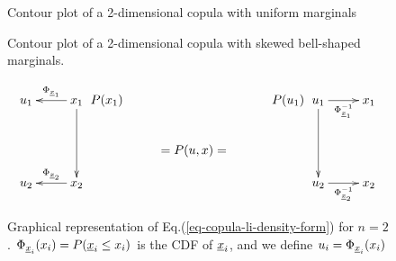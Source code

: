 \begin{figure}[!h]
\begin{floatrow}
 {\caption{Contour plot of a 2-dimensional copula
 with uniform marginals}
 \label{fig-copula1}}
 {\caption{Contour plot of a 2-dimensional copula
 with skewed bell-shaped marginals.}
 \label{fig-copula2}}
\end{floatrow}
\end{figure}





\begin{figure}[h!]
$$
\xymatrix{
u_1
&x_1\ar[l]_{\Phi_{\rvx_1}}\ar[dd]
\\
\\
u_2
&x_2\ar[l]_{\Phi_{\rvx_2}}
}
\xymatrix{P(x_1)
\\
&=P(u, x)=&}
\xymatrix{P(u_1)
\\}
\xymatrix{
u_1\ar[dd]\ar[r]_{\Phi_{\rvx_1}^{-1}}
&x_1
\\
\\
u_2\ar[r]_{\Phi_{\rvx_2}^{-1}}
&x_2
}
$$
\caption{Graphical representation
of Eq.(\ref{eq-copula-li-density-form}) for $n=2$.
$\Phi_{
{\underline{x}}_i}(x_i) = P({\underline{x}}_i\leq x_i)$
is the CDF of ${\underline{x}}_i$,
and we define
$u_i = \Phi_{{\underline{x}}_i}(x_i)$}
\label{fig-copula-li-bnet}
\end{figure}

